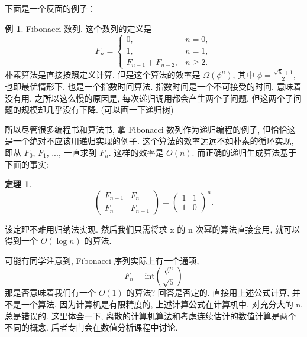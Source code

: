 \documentclass[a4paper]{ctexart}
\newtheorem{theorem}{定理}
\theoremstyle{definition}
\theoremstyle{definition}
\newtheorem{example}{例}[section]
\begin{document}

下面是一个反面的例子：

\begin{example}
  Fibonacci 数列. 这个数列的定义是 
  \begin{equation}
    F_n = \left\{
      \begin{array}{ll}
        0, & n = 0, \\
        1, & n = 1, \\
        F_{n - 1} + F_{n - 2}, & n \geq 2.
      \end{array}
    \right.
    \end{equation}
  朴素算法是直接按照定义计算. 但是这个算法的效率是 $\Omega(\phi^n)$, 其中 $\phi = \frac{\sqrt{5} + 1}{2}$, 
  也即最优情形下, 也是一个指数时间算法. 指数时间是一个不可接受的时间, 意味着没有用. 之所以这么慢的原因是, 每次递归调用都会产生两个子问题, 
  但这两个子问题的规模却几乎没有下降. (可以画一下递归树)
\end{example}

所以尽管很多编程书和算法书, 拿 Fibonacci 数列作为递归编程的例子, 但恰恰这是一个绝对不应该用递归实现的例子. 
这个算法的效率远远不如朴素的循环实现, 即从 $F_0$, $F_1$, $...$, 一直求到 $F_n$. 这样的效率是 $O(n)$.
而正确的递归生成算法基于下面的事实:

\begin{theorem}
\begin{equation}
  \left(
  \begin{array}{cc}
    F_{n + 1} & F_n \\
    F_n & F_{n - 1}
  \end{array}
  \right) = \left(
  \begin{array}{cc}
    1 & 1 \\
    1 & 0 
  \end{array}  
  \right)^n.
\end{equation}
\end{theorem}

该定理不难用归纳法实现. 然后我们只需将求 x 的 n 次幂的算法直接套用, 就可以得到一个 $O(\log n)$ 的算法. 

可能有同学注意到, Fibonacci 序列实际上有一个通项, 
\begin{equation}
  F_n = \mathrm{int} \left( \frac{\phi^n}{\sqrt{5}} \right)
\end{equation}
那是否意味着我们有一个 $O(1)$ 的算法? 回答是否定的. 直接用上述公式计算, 并不是一个算法. 因为计算机是有限精度的, 上述计算公式在计算机中, 
对充分大的 n, 总是错误的. 这里体会一下, 离散的计算机算法和考虑连续估计的数值计算是两个不同的概念. 后者专门会在数值分析课程中讨论. 
\end{document}

